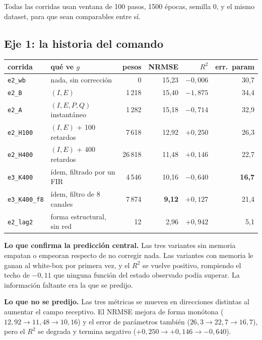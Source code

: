\documentclass[11pt,a4paper]{article}
\begin{document}
Todas las corridas usan ventana de 100 pasos, 1500 épocas, semilla 0, y el mismo
dataset, para que sean comparables entre sí.

\subsection{Eje 1: la historia del comando}

\begin{center}
\small
\begin{tabular}{llrrrr}
\toprule
\textbf{corrida} & \textbf{qué ve $g$} & \textbf{pesos} &
\textbf{NRMSE} & \textbf{$R^2$} & \textbf{err.\ param} \\
\midrule
\texttt{e2\_wb}   & nada, sin corrección      & 0 & 15{,}23 & $-0{,}006$ & 30{,}7 \\
\texttt{e2\_B}    & $(I,E)$                   & 1\,218 & 15{,}40 & $-1{,}875$ & 34{,}4 \\
\texttt{e2\_A}    & $(I,E,P,Q)$ instantáneo   & 1\,282 & 15{,}18 & $-0{,}714$ & 32{,}9 \\
\texttt{e2\_H100} & $(I,E)$ + 100 retardos    & 7\,618 & 12{,}92 & $+0{,}250$ & 26{,}3 \\
\texttt{e2\_H400} & $(I,E)$ + 400 retardos    & 26\,818 & 11{,}48 & $+0{,}146$ & 22{,}7 \\
\texttt{e3\_K400} & ídem, filtrado por un FIR & 4\,546 & 10{,}16 & $-0{,}640$ & \textbf{16{,}7} \\
\rowcolor{suave}
\texttt{e3\_K400\_f8} & ídem, filtro de 8 canales & 7\,874 & \textbf{9{,}12} & $+0{,}127$ & 21{,}4 \\
\midrule
\texttt{e2\_lag2} & forma estructural, sin red & 12 & 2{,}96 & $+0{,}942$ & 5{,}1 \\
\bottomrule
\end{tabular}
\end{center}

\smallskip\par\textbf{Lo que confirma la predicción central.} Las tres variantes sin
memoria empatan o empeoran respecto de no corregir nada. Las variantes con
memoria le ganan al white-box por primera vez, y el $R^2$ se vuelve positivo,
rompiendo el techo de $-0{,}11$ que ninguna función del estado observado podía
superar. La información faltante era la que se predijo.

\smallskip\par\textbf{Lo que no se predijo.} Las tres métricas se mueven en
direcciones distintas al aumentar el campo receptivo. El NRMSE mejora de forma
monótona ($12{,}92 \to 11{,}48 \to 10{,}16$) y el error de parámetros también
($26{,}3 \to 22{,}7 \to 16{,}7$), pero el $R^2$ se degrada y termina negativo
($+0{,}250 \to +0{,}146 \to -0{,}640$).
\end{document}
